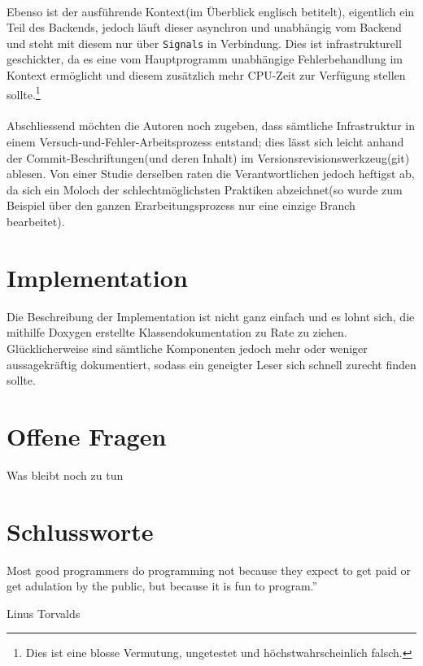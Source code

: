 \paragraph{}
    Ebenso ist der ausführende Kontext(im Überblick englisch betitelt), eigentlich ein Teil des Backends, jedoch läuft dieser asynchron und unabhängig vom Backend und
    steht mit diesem nur über \texttt{Signals} in Verbindung. Dies ist infrastrukturell geschickter, da es eine vom Hauptprogramm unabhängige Fehlerbehandlung im Kontext
    ermöglicht und diesem zusätzlich mehr CPU-Zeit zur Verfügung stellen sollte.\footnote{Dies ist eine blosse Vermutung, ungetestet und höchstwahrscheinlich falsch.}
\paragraph{}
    Abschliessend möchten die Autoren noch zugeben, dass sämtliche Infrastruktur in einem Versuch-und-Fehler-Arbeitsprozess entstand; dies lässt sich leicht anhand der
    Commit-Beschriftungen(und deren Inhalt) im Versionsrevisionswerkzeug(git) ablesen. Von einer Studie derselben raten die Verantwortlichen jedoch heftigst ab, da sich
    ein Moloch der schlechtmöglichsten Praktiken abzeichnet(so wurde zum Beispiel über den ganzen Erarbeitungsprozess nur eine einzige Branch bearbeitet).
\newpage
\section{Implementation} \label{sec:Imp}
	Die Beschreibung der Implementation ist nicht ganz einfach und es lohnt sich, die mithilfe Doxygen erstellte Klassendokumentation zu Rate zu ziehen. Glücklicher\-weise
    sind sämtliche Komponenten jedoch mehr oder weniger aussagekräftig dokumentiert, sodass ein geneigter Leser sich schnell zurecht finden sollte.
\section{Offene Fragen} \label{sec:WhatsNext}
	Was bleibt noch zu tun
\section{Schlussworte} \label{sec:Schluss}
	\epigraph{Most good programmers do programming not because they expect to get paid or get adulation by the public, but because it is fun to program.”}{Linus Torvalds}

